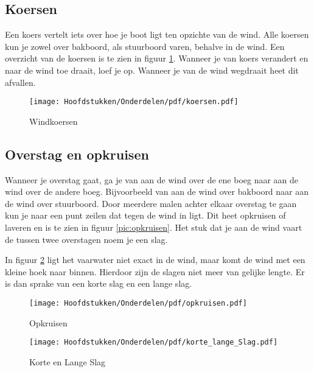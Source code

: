 \vfil\newpage

\subsection{Koersen}
Een koers vertelt iets over hoe je boot ligt ten opzichte van de wind. Alle koersen kun je zowel over bakboord, als stuurboord varen, behalve in de wind. Een overzicht van de koersen is te zien in figuur \ref{pic:koersen}. Wanneer je van koers verandert en naar de wind toe draait, loef je op. Wanneer je van de wind wegdraait heet dit afvallen. 

\begin{figure}[h]
	\centering
	\texttt{[image: Hoofdstukken/Onderdelen/pdf/koersen.pdf]}
	\caption{Windkoersen}
	\label{pic:koersen}
\end{figure}


\subsection{Overstag en opkruisen}
Wanneer je overstag gaat, ga je van aan de wind over de ene boeg naar aan de wind over de andere boeg. Bijvoorbeeld van aan de wind over bakboord naar aan de wind over stuurboord. Door meerdere malen achter elkaar overstag te gaan kun je naar een punt zeilen dat tegen de wind in ligt. Dit heet opkruisen of laveren en is te zien in figuur \ref{pic:opkruisen}. Het stuk dat je aan de wind vaart de tussen twee overstagen noem je een slag.  

In figuur \ref{pic:kort_lang} ligt het vaarwater niet exact in de wind, maar komt de wind met een kleine hoek naar binnen. Hierdoor zijn de slagen niet meer van gelijke lengte. Er is dan sprake van een korte slag en een lange slag.

\begin{figure}[h]
	\centering
	\begin{minipage}{0.40\textwidth}
		\centering
		\texttt{[image: Hoofdstukken/Onderdelen/pdf/opkruisen.pdf]}
		\caption{Opkruisen}
		\centering
		\label{pic:opkruisen}
	\end{minipage}
	\begin{minipage}{0.40\textwidth}
		\centering
		\texttt{[image: Hoofdstukken/Onderdelen/pdf/korte\_lange\_Slag.pdf]}
		\caption{Korte en Lange Slag}
		\label{pic:kort_lang}
	\end{minipage}
\end{figure}

